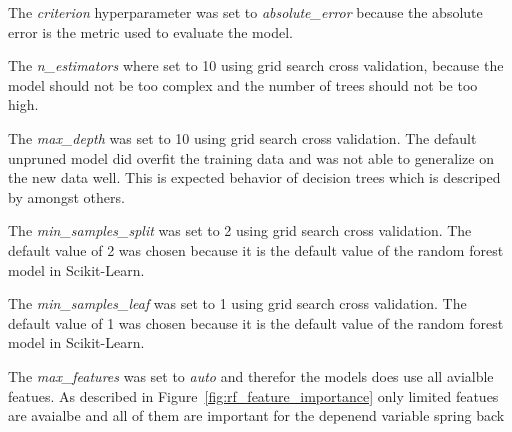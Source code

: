 The \textit{criterion} hyperparameter was set to \textit{absolute\_error}
because the absolute
error is the metric
used to evaluate the model.

The \textit{n\_estimators} where set to 10 using grid search cross
validation, because the model
should not be too
complex and the number of trees should not be too high.

The \textit{max\_depth} was set to 10 using grid search cross validation. The
default unpruned
model did overfit the
training data and was not able to generalize on the new data well. This is
expected behavior of
decision trees which
is descriped by \cite[p. 133-136]{muller_introductionmachinelearning_2016}
amongst others.

The \textit{min\_samples\_split} was set to 2 using grid search cross
validation. The default
value of 2 was chosen
because it is the default value of the random forest model in Scikit-Learn.

The \textit{min\_samples\_leaf} was set to 1 using grid search cross
validation. The default
value of 1 was chosen
because it is the default value of the random forest model in Scikit-Learn.

The \textit{max\_features} was set to \textit{auto} and therefor the models
does use all avialble
featues. As
described in Figure~\ref{fig:rf_feature_importance} only limited featues are
avaialbe and all of
them are important
for the depenend variable spring back


